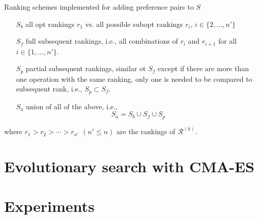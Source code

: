 \documentclass[xcolor=pdftex,t,11pt,handout]{beamer}
\begin{document}
{	\framebreak 
	\begin{block}{Ranking schemes implemented for adding preference pairs to $S$}
	\begin{itemize}
		\item[$S_{b}$] all opt rankings $r_1$ vs. all possible subopt rankings $r_i$, $i\in\{2,...,n'\}$
		\item[$S_{f}$] full subsequent rankings, i.e., all combinations of $r_i$ and $r_{i+1}$ for all $i\in\{1,...,n'\}$. 
		\item[$S_{p}$] partial subsequent rankings, similar ot $S_f$ except if there are more than one operation with the same ranking, only one is needed to be compared to subsequent rank, i.e., $S_p\subset S_f$.
		\item[$S_{a}$] union of all of the above, i.e., 
		$$ S_{a} = S_b \cup S_f \cup S_p$$
	\end{itemize}
	where $r_1>r_2>\cdots>r_{n'}$ $(n'\leq n)$ are the rankings of $\mathcal{R}^{(k)}$.
	\end{block}
}








\section{Evolutionary search with CMA-ES}
\frame{\tableofcontents[currentsection]}
\section{Experiments}
\frame{\tableofcontents[currentsection]}
\end{document}
